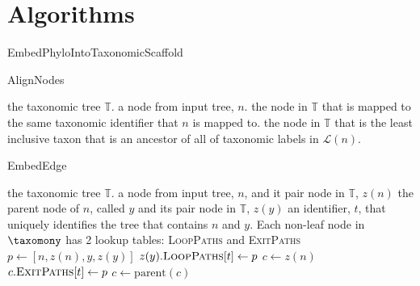 \documentclass[11pt]{article}
\newcommand{\leafLabels}[1]{\ensuremath{\mathcal{L}(#1)}}
\newcommand{\parent}[1]{\ensuremath{\mbox{parent}(#1)}}
\newcommand{\nodes}[1]{\ensuremath{\mbox{nodes}(#1)}}
\newcommand{\treeRoot}[1]{\ensuremath{\mbox{root}(#1)}}
\newcommand{\taxonomy}[0]{\ensuremath{\mathbb{T}}\xspace}
\begin{document}
\section{Algorithms}
\begin{algorithm} \caption{EmbedPhyloIntoTaxonomicScaffold}\label{embedTree} \begin{algorithmic}
\REQUIRE the taxonomic tree $\taxonomy$.
\REQUIRE an input tree, $T$ with a unique identifier $\mbox{id}(T)$
\FOR{each node $n_i$ in $\nodes{T}$}
    \STATE{$z(n_i) \leftarrow \mbox{AlignNodes}(\taxonomy, n_i)$
\ENDFOR
\FOR{each node $n_i$ in $\nodes{T}$}
    \IF{$n_i \neq \treeRoot{T}$}
    \STATE $y_i \leftarrow \parent{n_i}$
    \STATE$\mbox{EmbedEdge}(\taxonomy, {y_i}, z(y_i), n_i, z(n_i), \mbox{id}(T))$
    \ENDIF
\ENDFOR
\end{algorithmic}\end{algorithm}
\begin{algorithm} \caption{AlignNodes}\label{alignNodes} \begin{algorithmic}
\REQUIRE the taxonomic tree $\taxonomy$.
\REQUIRE a node from input tree, $n$.
    \RETURN the node in $\taxonomy$ that is mapped to the same taxonomic identifier that $n$ is mapped to.
\ELSE
    \RETURN the node in $\taxonomy$ that is the least inclusive taxon that is an ancestor of all of 
    taxonomic labels in $\leafLabels{n}$.
\ENDIF
\end{algorithmic}\end{algorithm}
\begin{algorithm} \caption{EmbedEdge}\label{embedEdge} \begin{algorithmic}
\REQUIRE the taxonomic tree $\taxonomy$.
\REQUIRE a node from input tree, $n$, and it pair node in $\taxonomy$, $z(n)$
\REQUIRE the parent node of $n$, called $y$ and its pair node in $\taxonomy$, $z(y)$
\REQUIRE an identifier, $t$, that uniquely identifies the tree that contains $n$ and $y$.
\REQUIRE Each non-leaf node in $\taxomony$ has 2 lookup tables: \textsc{LoopPaths} and \textsc{ExitPaths}
\STATE $p \leftarrow \left[n, z(n), y, z(y)\right]$ 
    \STATE $z(y).\textsc{LoopPaths}[t] \leftarrow p$
\ELSE
    \STATE $c\leftarrow z(n)$
        \STATE $c.\textsc{ExitPaths}[t] \leftarrow p$
        \STATE $c \leftarrow \parent{c}$
    \ENDWHILE
\ENDIF
\end{algorithmic}\end{algorithm}




\end{document}
